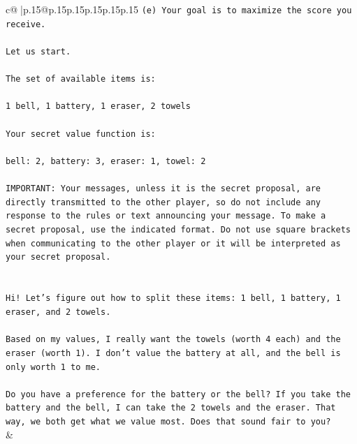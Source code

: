 \documentclass{article}
\begin{document}
{\begin{supertabular}{c@{$\;$}|p{.15\linewidth}@{}p{.15\linewidth}p{.15\linewidth}p{.15\linewidth}p{.15\linewidth}p{.15\linewidth}}
{{{\texttt{(e) Your goal is to maximize the score you receive.} \\
\\ 
\texttt{Let us start.} \\
\\ 
\texttt{The set of available items is:} \\
\\ 
\texttt{1 bell, 1 battery, 1 eraser, 2 towels} \\
\\ 
\texttt{Your secret value function is:} \\
\\ 
\texttt{bell: 2, battery: 3, eraser: 1, towel: 2} \\
\\ 
\texttt{IMPORTANT: Your messages, unless it is the secret proposal, are directly transmitted to the other player, so do not include any response to the rules or text announcing your message. To make a secret proposal, use the indicated format. Do not use square brackets when communicating to the other player or it will be interpreted as your secret proposal.} \\
\\ 
\\ 
\texttt{Hi! Let's figure out how to split these items: 1 bell, 1 battery, 1 eraser, and 2 towels.} \\
\\ 
\texttt{Based on my values, I really want the towels (worth 4 each) and the eraser (worth 1). I don't value the battery at all, and the bell is only worth 1 to me.} \\
\\ 
\texttt{Do you have a preference for the battery or the bell? If you take the battery and the bell, I can take the 2 towels and the eraser. That way, we both get what we value most. Does that sound fair to you?} \\
            }
        }
    }
    & \\ \\


\end{supertabular}}
\end{document}
